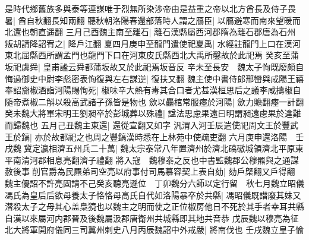 是時代鄉舊族多與泰等連謀唯于烈無所染涉帝由是益重之帝以北方酋長及侍子畏暑|{
	酋自秋翻長知兩翻}
聽秋朝洛陽春還部落時人謂之鴈臣|{
	以鴈避寒而南來望暖而北還也朝直遥翻}
三月己酉魏主南至離石|{
	離石漢縣屬西河郡隋為離石郡唐為石州}
叛胡請降詔宥之|{
	降戶江翻}
夏四月庚申至龍門遣使祀夏禹|{
	水經註龍門上口在漢河東北屈縣西所謂孟門也龍門下口在河東皮氏縣西北大禹所鑿故於此祀焉}
癸亥至蒲坂祀虞舜|{
	皇甫謐云舜都蒲坂故又於此祀焉坂音反}
辛未至長安　魏太子恂既廢頗自悔過御史中尉李彪密表恂復與左右謀逆|{
	復扶又翻}
魏主使中書侍郎邢巒與咸陽王禧奉詔齎椒酒詣河陽賜恂死|{
	椒味辛大熱有毒其合口者尤甚漢桓思后之議李咸擣椒自隨帝煮椒二斛以殺高武諸子孫皆是物也}
歛以麤棺常服瘞於河陽|{
	歛力贍翻瘞一計翻}
癸未魏大將軍宋明王劉昶卒於彭城葬以殊禮|{
	諡法思慮果遠曰明謂昶遠慮果於違難而歸魏也}
五月己丑魏主東還|{
	還從宣翻又如字}
汎渭入河壬辰遣使祀周文王於豐武王於鎬|{
	亦於故都祀之也周之豐鎬漢時悉在上林苑中使疏吏翻}
六月庚申還洛陽　壬戌魏冀定瀛相濟五州兵二十萬|{
	魏太宗泰常八年置濟州於濟北碻磝城領濟北平原東平南清河郡相息亮翻濟子禮翻}
將入寇　魏穆泰之反也中書監魏郡公穆羆與之通謀赦後事削官爵為民羆弟司空亮以府事付司馬慕容契上表自劾|{
	劾戶槩翻又戶得翻}
魏主優詔不許亮固請不己癸亥聽亮遜位　丁卯魏分六師以定行留　秋七月魏立昭儀馮氏為皇后后欲母養太子恪恪母高氏自代如洛陽暴卒於共縣|{
	馮昭儀既譛廢其妹又潜殺太子之母其心盖梟獍也以魏主之明而使之正位椒房他日不死於其手者幸耳共縣自漢以來屬河内郡晉及後魏屬汲郡唐衛州共城縣即其地共音恭}
戊辰魏以穆亮為征北大將軍開府儀同三司冀州刺史八月丙辰魏詔中外戒嚴|{
	將南伐也}
壬戌魏立皇子愉

